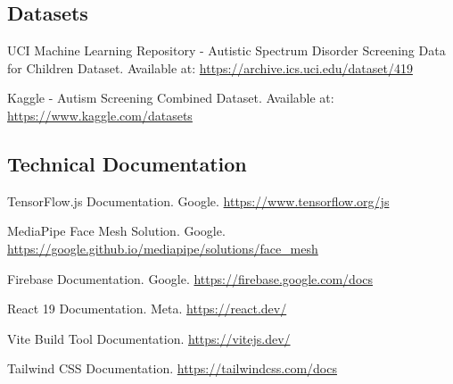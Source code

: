 \documentclass[12pt,letterpaper]{article}
\begin{document}
\subsection*{Datasets}

\begin{enumerate}[label={[\arabic*]},resume]
    \item UCI Machine Learning Repository - Autistic Spectrum Disorder Screening Data for Children Dataset. Available at: \url{https://archive.ics.uci.edu/dataset/419}
    
    \item Kaggle - Autism Screening Combined Dataset. Available at: \url{https://www.kaggle.com/datasets}
\end{enumerate}

\subsection*{Technical Documentation}

\begin{enumerate}[label={[\arabic*]},resume]
    \item TensorFlow.js Documentation. Google. \url{https://www.tensorflow.org/js}
    
    \item MediaPipe Face Mesh Solution. Google. \url{https://google.github.io/mediapipe/solutions/face_mesh}
    
    \item Firebase Documentation. Google. \url{https://firebase.google.com/docs}
    
    \item React 19 Documentation. Meta. \url{https://react.dev/}
    
    \item Vite Build Tool Documentation. \url{https://vitejs.dev/}
    
    \item Tailwind CSS Documentation. \url{https://tailwindcss.com/docs}
\end{enumerate}
\end{document}
